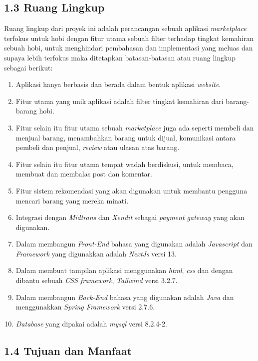 \documentclass[a4paper]{article}
\begin{document}
\subsection*{1.3 Ruang Lingkup}
Ruang lingkup dari proyek ini adalah perancangan sebuah aplikasi \textit{marketplace} terfokus untuk hobi dengan fitur utama sebuah filter terhadap tingkat kemahiran sebuah hobi, untuk menghindari pembahasan dan implementasi yang meluas dan supaya lebih terfokus maka ditetapkan batasan-batasan atau ruang lingkup sebagai berikut:
\begin{enumerate}
    \item Aplikasi hanya berbasis dan berada dalam bentuk aplikasi \textit{website}.
    \item Fitur utama yang unik aplikasi adalah filter tingkat kemahiran dari barang-barang hobi.
    \item Fitur selain itu fitur utama sebuah \textit{marketplace} juga ada seperti membeli dan menjual barang, menambahkan barang untuk dijual, komunikasi antara pembeli dan penjual, \textit{review} atau ulasan atas barang.
    \item Fitur selain itu fitur utama tempat wadah berdiskusi, untuk membaca, membuat dan membalas post dan komentar.
    \item Fitur sistem rekomendasi yang akan digunakan untuk membantu pengguna mencari barang yang mereka minati.
    \item Integrasi dengan \textit{Midtrans} dan \textit{Xendit} sebagai \textit{payment gateway} yang akan digunakan.
    \item Dalam membangun \textit{Front-End} bahasa yang digunakan adalah \textit{Javascript} dan \textit{Framework} yang digunakkan adalah \textit{NextJs} versi 13.
    \item Dalam membuat tampilan aplikasi menggunakan \textit{html}, \textit{css} dan dengan dibantu sebuah \textit{CSS framework}, \textit{Tailwind} versi 3.2.7.
    \item Dalam membangun \textit{Back-End} bahasa yang digunakan adalah \textit{Java} dan menggunakkan \textit{Spring Framework} versi 2.7.6.
    \item \textit{Database} yang dipakai adalah \textit{mysql} versi 8.2.4-2.
\end{enumerate}

\subsection*{1.4 Tujuan dan Manfaat}
\end{document}
